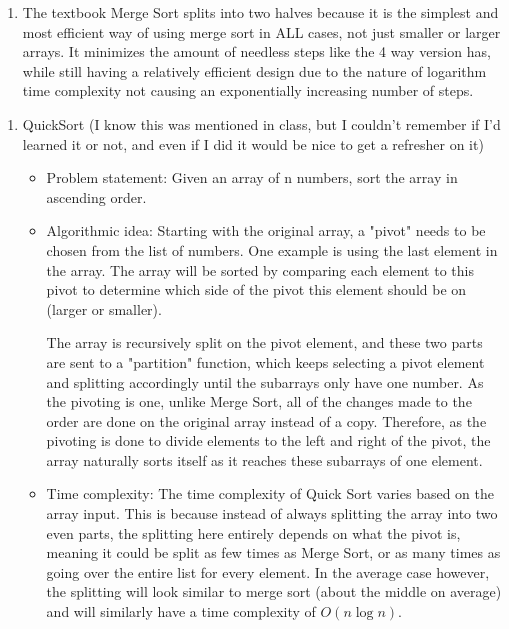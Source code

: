 \documentclass[11pt]{article}
\begin{document}
\begin{enumerate}
\item The textbook Merge Sort splits into two halves because it is the simplest and most efficient way of using merge sort in ALL cases, not just smaller or larger arrays. It minimizes the amount of needless steps like the 4 way version has, while still having a relatively efficient design due to the nature of logarithm time complexity not causing an exponentially increasing number of steps.
\end{enumerate}

\bigskip


\begin{enumerate}
\item QuickSort (I know this was mentioned in class, but I couldn't remember if I'd learned it or not, and even if I did it would be nice to get a refresher on it)

\begin{itemize}
\item Problem statement: Given an array of n numbers, sort the array in ascending order.

\item Algorithmic idea: Starting with the original array, a "pivot" needs to be chosen from the list of numbers. One example is using the last element in the array. The array will be sorted by comparing each element to this pivot to determine which side of the pivot this element should be on (larger or smaller).

The array is recursively split on the pivot element, and these two parts are sent to a "partition" function, which keeps selecting a pivot element and splitting accordingly until the subarrays only have one number. As the pivoting is one, unlike Merge Sort, all of the changes made to the order are done on the original array instead of a copy. Therefore, as the pivoting is done to divide elements to the left and right of the pivot, the array naturally sorts itself as it reaches these subarrays of one element. 

\item Time complexity: The time complexity of Quick Sort varies based on the array input. This is because instead of always splitting the array into two even parts, the splitting here entirely depends on what the pivot is, meaning it could be split as few times as Merge Sort, or as many times as going over the entire list for every element. In the average case however, the splitting will look similar to merge sort (about the middle on average) and will similarly have a time complexity of $O(n\log n)$.


\end{itemize}
\end{enumerate}
\end{document}
